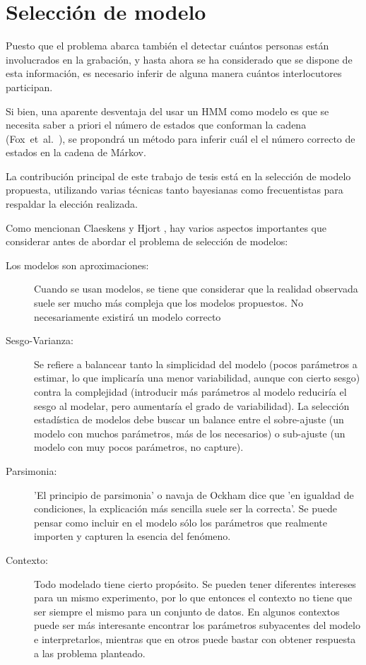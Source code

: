 
\chapter{Selección de modelo} \label{ch:chap4}


Puesto que el problema abarca también el detectar cuántos personas están involucrados en la grabación, y hasta ahora se ha considerado que se dispone de esta información, es necesario inferir de alguna manera cuántos interlocutores participan.

Si bien, una aparente desventaja del usar un \ac{HMM} como modelo es que se necesita saber a priori el número de estados que conforman la cadena (Fox~et~al.~\cite{Fox2011}), se propondrá un método para inferir cuál el el número correcto de estados en la cadena de Márkov.

La contribución principal de este trabajo de tesis está en la selección de modelo propuesta, utilizando varias técnicas tanto bayesianas como frecuentistas para respaldar la elección realizada.

Como mencionan Claeskens y Hjort \cite{Claeskens2010}, hay varios aspectos importantes que considerar antes de abordar el problema de selección de modelos: 

\begin{description}
\item[Los modelos son aproximaciones:] Cuando se usan modelos, se tiene que considerar que la realidad observada suele ser mucho más compleja que los modelos propuestos. No necesariamente existirá un modelo correcto 

\item[Sesgo-Varianza:] Se refiere a balancear tanto la simplicidad del modelo (pocos parámetros a estimar, lo que implicaría una menor variabilidad, aunque con cierto sesgo) contra la complejidad (introducir más parámetros al modelo reduciría el sesgo al modelar, pero aumentaría el grado de variabilidad). La selección estadística de modelos debe buscar un balance entre el sobre-ajuste (un modelo con muchos parámetros, más de los necesarios) o sub-ajuste (un modelo con muy pocos parámetros, no capture).

\item[Parsimonia:] 'El principio de parsimonia' o navaja de Ockham dice que 'en igualdad de condiciones, la explicación más sencilla suele ser la correcta'. Se puede pensar como incluir en el modelo sólo los parámetros que realmente importen y capturen la esencia del fenómeno. 

\item[Contexto:] Todo modelado tiene cierto propósito. Se pueden tener diferentes intereses para un mismo experimento, por lo que entonces el contexto no tiene que ser siempre el mismo para un conjunto de datos. En algunos contextos puede ser más interesante encontrar los parámetros subyacentes del modelo e interpretarlos, mientras que en otros puede bastar con obtener respuesta a las problema planteado.

\end{description}

